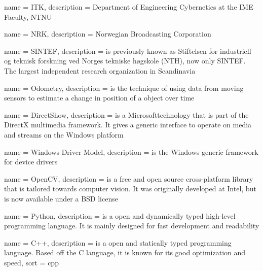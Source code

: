 


{
	name		= {ITK},
	description = {Department of Engineering Cybernetics at the IME Faculty, NTNU}
}

{
	name		= {NRK},
	description = {Norwegian Broadcasting Corporation}
}

{
	name		= {SINTEF},
	description = {is previously known as Stiftelsen for industriell og teknisk forskning ved Norges tekniske høgskole (NTH), now only SINTEF. The largest independent research organization in Scandinavia}
}

{
	name		= {Odometry},
	description	= {is the technique of using data from moving sensors to estimate a change in position of a object over time}
}

{
	name		= {DirectShow},
	description = {is a Microsoft\texttrademark technology that is part of the DirectX multimedia framework. 
					It gives a generic interface to operate on media and streams on the Windows platform}
}

{
	name		= {Windows Driver Model},
	description = {is the Windows generic framework for device drivers}
}

{
	name		= {OpenCV},
	description = {is a free and open source cross-platform library that is tailored towards computer vision. It was originally developed at Intel, but is 
					now available under a BSD license}
}

{
	name		= {Python},
	description = {is a open and dynamically typed high-level programming language. It is mainly designed for fast development and readability}
}

{
	name		= {C++},
	description = {is a open and statically typed programming language. Based off the C language, it is known for its good optimization and speed},
	sort		= {cpp}
}
